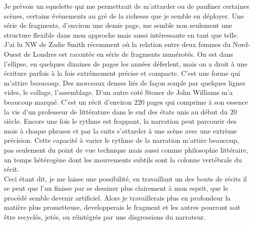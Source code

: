   Je prévois un squelette qui me permettrait
de m'attarder ou de paufiner certaines scènes, certains évènements au gré de la
richesse que je semble en déployer. Une série de fragments, d'environ une demie
page, me semble non seulement une structure flexible dans mon approche mais
aussi intéressante en tant que telle. \\

J'ai lu NW de Zadie Smith récemment où la relation entre deux femmes du
Nord-Ouest de Londres est racontée en série de fragments numérotés. On est dans
l'ellipse, en quelques dizaines de pages les années déferlent, mais on a droit
à une écriture parfois à la fois extrêmement précise et compacte.  C'est une
forme qui m'attire beaucoup. Des morceaux denses liés de façon souple par
quelques lignes vides, le collage, l'assemblage. D'un autre coté Stoner de John
Williams m'a beaucoup marqué. C'est un récit d'environ 220 pages qui comprime à
son essence la vie d'un professeur de littérature dans le sud des états unis au
début du 20 siècle. Encore une fois le rythme est frappant, la narration peut
parcourir des mois à chaque phrases et par la suite s'attarder à une scène avec
une extrème précision. Cette capacité à varier le rythme de la narration
m'attire beaucoup, pas seulement du point de vue technique mais aussi comme
philosophie littéraire, un temps hétérogène dont les mouvements subtils sont la
colonne vertébrale du récit.\\

Ceci étant dit, je me laisse une possibilité, en travaillant un des bouts de
récits il se peut que l'un finisse par se dessiner plus clairement à mon
esprit, que le procédé semble devenir artificiel. Alors je travaillerais plus
en profondeur la matière plus prometteuse, developperais le fragment et les
autres pourront soit être recyclés, jetés, ou réintégrés par une disgressions du
narrateur.\\ 

